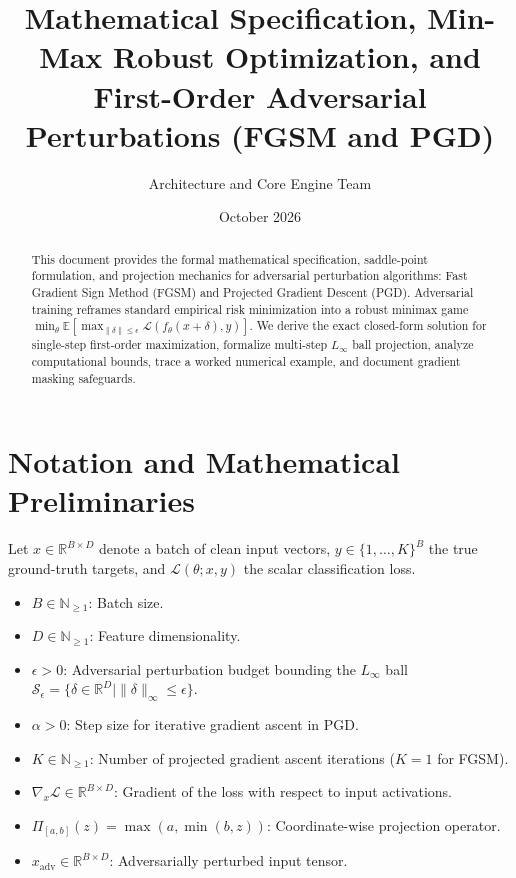\documentclass[11pt,a4paper]{article}
\title{\textbf{Mathematical Specification, Min-Max Robust Optimization, and First-Order Adversarial Perturbations (FGSM and PGD)}}
\author{Architecture and Core Engine Team}
\date{October 2026}
\theoremstyle{definition}
\begin{document}
\maketitle

\begin{abstract}
This document provides the formal mathematical specification, saddle-point formulation, and projection mechanics for adversarial perturbation algorithms: Fast Gradient Sign Method (FGSM) and Projected Gradient Descent (PGD). Adversarial training reframes standard empirical risk minimization into a robust minimax game $\min_\theta \mathbb{E} [\max_{\|\delta\| \le \epsilon} \mathcal{L}(f_\theta(x + \delta), y)]$. We derive the exact closed-form solution for single-step first-order maximization, formalize multi-step $L_\infty$ ball projection, analyze computational bounds, trace a worked numerical example, and document gradient masking safeguards.
\end{abstract}

\section{Notation and Mathematical Preliminaries}

Let $x \in \mathbb{R}^{B \times D}$ denote a batch of clean input vectors, $y \in \{1, \dots, K\}^B$ the true ground-truth targets, and $\mathcal{L}(\theta; x, y)$ the scalar classification loss.

\begin{itemize}
    \item $B \in \mathbb{N}_{\ge 1}$: Batch size.
    \item $D \in \mathbb{N}_{\ge 1}$: Feature dimensionality.
    \item $\epsilon > 0$: Adversarial perturbation budget bounding the $L_\infty$ ball $\mathcal{S}_\epsilon = \{\delta \in \mathbb{R}^D \mid \|\delta\|_\infty \le \epsilon\}$.
    \item $\alpha > 0$: Step size for iterative gradient ascent in PGD.
    \item $K \in \mathbb{N}_{\ge 1}$: Number of projected gradient ascent iterations ($K = 1$ for FGSM).
    \item $\nabla_x \mathcal{L} \in \mathbb{R}^{B \times D}$: Gradient of the loss with respect to input activations.
    \item $\Pi_{[a, b]}(z) = \max(a, \min(b, z))$: Coordinate-wise projection operator.
    \item $x_{\text{adv}} \in \mathbb{R}^{B \times D}$: Adversarially perturbed input tensor.
\end{itemize}
\end{document}
